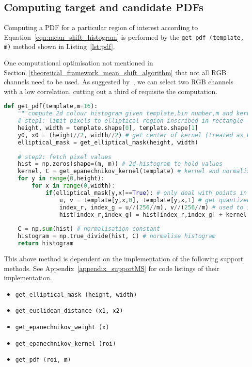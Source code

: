 \subsection{Computing target and candidate PDFs}
Computing a PDF for a particular region of interest according to 
Equation~\ref{eqn:mean_shift_histogram} is performed by the \lstinline{get_pdf (template, m)} 
method shown in Listing~\ref{lst:pdf}.

One computational optimisation not mentioned in
Section~\ref{theoretical_framework_mean_shift_algorithm} that not all RGB
channels need to be used. As suggested by~\cite{Valenti2003}, we can select two
RGB channels with a low correlation, cutting out a third of requisite the computation. 

\begin{lstlisting}[language=Python, caption={Function computing the PDF}, captionpos=b, label={lst:pdf}]
def get_pdf(template,m=16):
    """compute 2d colour histogram given template,bin number,m and kernel function"""
    # step1: limit pixels to elliptical region inscribed in rectangle
    height, width = template.shape[0], template.shape[1]
    y0, x0 = (height//2, width//2) # get center of kernel (treated as 0,0) == hy and hx 
    elliptical_mask = get_elliptical_mask(height, width)
       
    # step2: fetch pixel values
    hist = np.zeros(shape=(m, m)) # 2d-histogram to hold values 
    kernel, C = get_epanechnikov_kernel(template) # kernel and normalisation constant, C
    for y in range(0,height):
        for x in range(0,width): 
            if(elliptical_mask[y,x]==True): # only deal with points in the mask
                u, v = template[y,x,0], template[y,x,1] # get quantized R, G
                index_r, index_g = u//(256//m), v//(256//m) # used to index 2d-histogram
                hist[index_r,index_g] = hist[index_r,index_g] + kernel[y,x] # add weighted point
    
    C = np.sum(hist) # normalisation constant
    histogram = np.true_divide(hist, C) # normalise histogram
    return histogram 
\end{lstlisting}

This above method is dependent on the implementation of the following support
methods. See Appendix~\ref{appendix_supportMS} for code listings of their implementation.
\begin{itemize}
    \item \lstinline{get_elliptical_mask (height, width)}
    \item \lstinline{get_euclidean_distance (x1, x2)}
    \item \lstinline{get_epanechnikov_weight (x)}
    \item \lstinline{get_epanechnikov_kernel (roi)}
    \item \lstinline{get_pdf (roi, m)}
\end{itemize}

